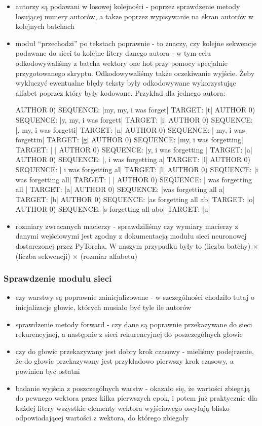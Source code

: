 	\begin{itemize} 
	  \item {autorzy są podawani w losowej kolejności - poprzez sprawdzenie metody losującej numery autorów,
	  a takze poprzez wypisywanie na ekran autorów w kolejnych batchach}
	  \item {moduł ``przechodzi'' po tekstach poprawnie - to znaczy, czy kolejne sekwencje podawane do sieci to 
	  kolejne litery danego autora - w tym celu odkodowywaliśmy z batcha wektory one hot przy pomocy 
	  specjalnie przygotowanego skryptu. Odkodowywaliśmy także oczekiwanie wyjście. Żeby wykluczyć ewentualne błędy
	  teksty były odkodowywane wykorzystując alfabet poprzez który były kodowane.
	  Przykład dla jednego autora:
\begin{bash}
AUTHOR 0) SEQUENCE: |my, my, i was forget|     TARGET: |t|
AUTHOR 0) SEQUENCE: |y, my, i was forgett|     TARGET: |i|
AUTHOR 0) SEQUENCE: |, my, i was forgetti|     TARGET: |n|
AUTHOR 0) SEQUENCE: | my, i was forgettin|     TARGET: |g|
AUTHOR 0) SEQUENCE: |my, i was forgetting|     TARGET: | |
AUTHOR 0) SEQUENCE: |y, i was forgetting |     TARGET: |a|
AUTHOR 0) SEQUENCE: |, i was forgetting a|     TARGET: |l|
AUTHOR 0) SEQUENCE: | i was forgetting al|     TARGET: |l|
AUTHOR 0) SEQUENCE: |i was forgetting all|     TARGET: | |
AUTHOR 0) SEQUENCE: | was forgetting all |     TARGET: |a|
AUTHOR 0) SEQUENCE: |was forgetting all a|     TARGET: |b|
AUTHOR 0) SEQUENCE: |as forgetting all ab|     TARGET: |o|
AUTHOR 0) SEQUENCE: |s forgetting all abo|     TARGET: |u|
\end{bash} }
	  \item {rozmiary zwracanych macierzy - sprawdziliśmy czy wymiary macierzy z danymi wejściowymi jest zgodny 
	  z dokumentacją modułu sieci neuronowej dostarczonej przez PyTorcha. W naszym przypadku były to 
	  (liczba batchy) $\times$ (liczba sekwencji) $\times$ (rozmiar alfabetu) }
	\end{itemize}

\subsubsection{Sprawdzenie modułu sieci}

	\begin{itemize} 
	  \item {czy warstwy są poprawnie zainicjalizowane - w szczególności chodziło tutaj o inicjalizacje głowic, 
	  których musiało być tyle ile autorów}
	  \item {sprawdzenie metody forward - czy dane są poprawnie przekazywane do sieci rekurencyjnej, a następnie 
	  z sieci rekurencyjnej do poszczególnych głowic}
	  \item {czy do głowic przekazywany jest dobry krok czasowy - mieliśmy podejrzenie, że do głowic przekazywany jest przykładowo
	  pierwszy krok czasowy, a powinien być ostatni}
	  \item {badanie wyjścia z poszczególnych warstw - okazało się, że wartości zbiegają do pewnego wektora przez kilka pierwszych epok,
	  i potem już praktycznie dla każdej litery wszystkie elementy wektora wyjściowego oscylują blisko odpowiadającej wartości z  wektora,
	  do którego zbiegały}
	\end{itemize}

